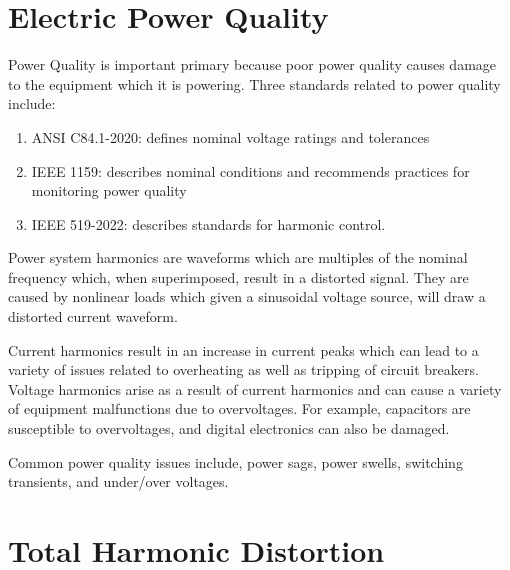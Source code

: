 \documentclass{homework}
\begin{document}
\section{Electric Power Quality}
\begin{letterenum}
    \item Power Quality is important primary because poor power quality causes
        damage to the equipment which it is powering. Three standards
        related to power quality include:
        \begin{enumerate}
            \item ANSI C84.1-2020: defines nominal voltage ratings and tolerances
            \item IEEE 1159: describes nominal conditions and recommends practices
                for monitoring power quality
            \item IEEE 519-2022: describes standards for harmonic control.
        \end{enumerate}
    
    \item Power system harmonics are waveforms which are multiples of the nominal
        frequency which, when superimposed, result in a distorted signal. They
        are caused by nonlinear loads which given a sinusoidal voltage 
        source, will draw a distorted current waveform.

    \item Current harmonics result in an increase in current peaks which can
        lead to a variety of issues related to overheating as well as tripping
        of circuit breakers. Voltage harmonics arise as a result of current
        harmonics and can cause a variety of equipment malfunctions due to overvoltages.
        For example, capacitors are susceptible to overvoltages, and digital electronics can
        also be damaged.

    \item Common power quality issues include, power sags, power swells, switching
        transients, and under/over voltages.
\end{letterenum}

\section{Total Harmonic Distortion}
\end{document}
